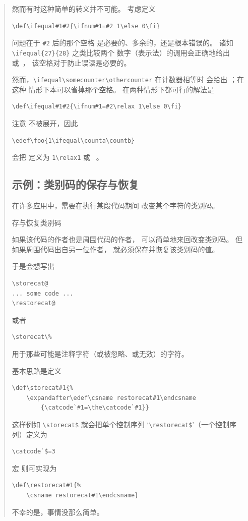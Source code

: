 \documentclass[a4paper]{rapport3}
\def\alt{}\def\altt{}%
\newenvironment{disp}{\begin{quotation}}{\end{quotation}}
\def\howto#1\par{}
\begin{document}
\begin{disp}
然而有时这种简单的转义并不可能。
考虑定义
\begin{verbatim}
\def\ifequal#1#2{\ifnum#1=#2 1\else 0\fi}
\end{verbatim}
问题在于 \verb-#2- 后的那个空格
是必要的、多余的，还是根本错误的。
诸如 \verb-\ifequal{27}{28}- 之类比较两个
数字（表示法）的调用会正确地给出  或~，
该空格对于防止误读是必要的。

然而，\verb-\ifequal\somecounter\othercounter- 在计数器相等时
会给出 ；在这种
情形下本可以省掉那个空格。
在两种情形下都可行的解法是
\begin{verbatim}
\def\ifequal#1#2{\ifnum#1=#2\relax 1\else 0\fi}
\end{verbatim}
注意  不被展开，因此
\begin{verbatim}
\edef\foo{1\ifequal\counta\countb}
\end{verbatim}
会把  定义为 \verb-1\relax1- 或 ~。

\subsection{示例：类别码的保存与恢复}
\label{store:cat}

在许多应用中，需要在执行某段代码期间
改变某个字符的类别码。\howto 保存与恢复类别码\par
如果该代码的作者也是周围代码的作者，
可以简单地来回改变类别码。
但如果周围代码出自另一位作者，
就必须保存并恢复该类别码的值。

于是会想写出
\begin{verbatim}
\storecat@
... some code ...
\restorecat@
\end{verbatim}
或者 \begin{verbatim}
\storecat\%
\end{verbatim}
用于那些可能是注释字符（或被忽略、或无效）的字符。
\alt
基本思路是定义
\begin{verbatim}
\def\storecat#1{%
    \expandafter\edef\csname restorecat#1\endcsname
        {\catcode`#1=\the\catcode`#1}}
\end{verbatim}
这样例如 \verb>\storecat$> 就会把单个控制序列
`\verb>\restorecat$>'（一个控制序列）定义为 \begin{verbatim}
\catcode`$=3
\end{verbatim}
宏  则可实现为
\begin{verbatim}
\def\restorecat#1{%
    \csname restorecat#1\endcsname}
\end{verbatim}
不幸的是，事情没那么简单。


\end{disp}
\end{document}
